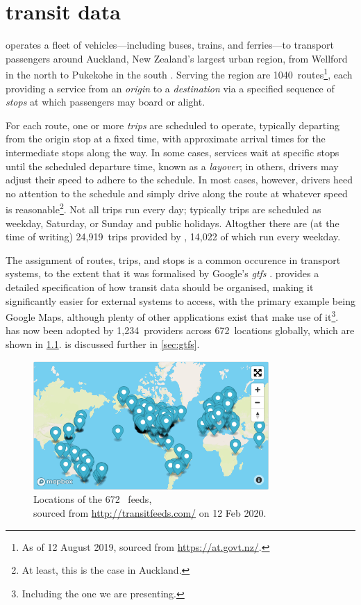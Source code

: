 \chapter{\Rt{} transit data}
\label{cha:data}



\AT{} operates a fleet of vehicles---including buses, trains, and ferries---to transport passengers around Auckland, New Zealand's largest urban region, from Wellford in the north to Pukekohe in the south \citep{cn}. Serving the region are 1040~routes\footnote{As of 12 August 2019, sourced from \url{https://at.govt.nz/}.}, each providing a service from an \emph{origin} to a \emph{destination} via a specified sequence of \emph{stops} at which passengers may board or alight.


For each route, one or more \emph{trips} are scheduled to operate, typically departing from the origin stop at a fixed time, with approximate arrival times for the intermediate stops along the way. In some cases, services wait at specific stops until the scheduled departure time, known as a \emph{layover}; in others, drivers may adjust their speed to adhere to the schedule. In most cases, however, drivers heed no attention to the schedule and simply drive along the route at whatever speed is reasonable\footnote{At least, this is the case in Auckland.}. Not all trips run every day; typically trips are scheduled as weekday, Saturday, or Sunday and public holidays. Altogther there are (at the time of writing) 24,919~trips provided by \AT{}, 14,022 of which run every weekday.


The assignment of routes, trips, and stops is a common occurence in transport systems, to the extent that it was formalised by Google's \emph{\acrfull{gtfs}} \citep {GoogleDevelopers_2006}. \GTFS{} provides a detailed specification of how transit data should be organised, making it significantly easier for external systems to access, with the primary example being Google Maps, although plenty of other applications exist that make use of it\footnote{Including the one we are presenting.}. \GTFS{} has now been adopted by 1,234~providers across 672~locations globally, which are shown in \cref{fig:gtfs_feeds}. \GTFS{} is discussed further in \cref{sec:gtfs}.

\begin{figure}
\centering
\includegraphics[width=0.8\textwidth]{figure/gtfs_feeds.png}
\caption[Locations of GTFS feeds]{Locations of the 672~\GTFS{} feeds,\\
sourced from \url{http://transitfeeds.com/} on 12 Feb 2020.}
\label{fig:gtfs_feeds}
\end{figure}


